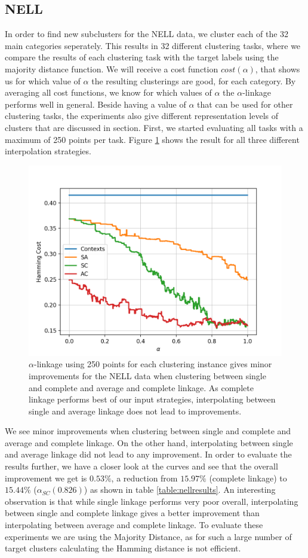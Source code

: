 \subsection{NELL}

In order to find new subclusters for the NELL data, we cluster each of the 32 main categories seperately. This results in 32 different clustering tasks, where we compare the results of each clustering task with the target labels using the majority distance function. We will receive a cost function $cost(\alpha)$, that shows us for which value of $\alpha$ the resulting clusterings are good, for each category. By averaging all cost functions, we know for which values of $\alpha$ the $\alpha$-linkage performs well in general. Beside having a value of $\alpha$ that can be used for other clustering tasks, the experiments also give different representation levels of clusters that are discussed in section. First, we started evaluating all tasks with a maximum of 250 points per task. Figure \ref{fig:nellresults} shows the result for all three different interpolation strategies.

\begin{figure}[h]
\centering
  \includegraphics[width=.5\linewidth]{plots/nell_250}
\caption{$\alpha$-linkage using 250 points for each clustering instance gives minor improvements for the NELL data when clustering between single and complete and average and complete linkage. As complete linkage performs best of our input strategies, interpolating between single and average linkage does not lead to improvements.}
\label{fig:nellresults}
\end{figure}

We see minor improvements when clustering between single and complete and average and complete linkage. On the other hand, interpolating between single and average linkage did not lead to any improvement. In order to evaluate the results further, we have a closer look at the curves and see that the overall improvement we get is $0.53\%$, a reduction from $15.97\%$ (complete linkage) to $15.44\%$ ($\alpha_{SC}(0.826)$) as shown in table \ref{table:nellresults}. An interesting observation is that while single linkage performs very poor overall, interpolating between single and complete linkage gives a better improvement than interpolating between average and complete linkage. To evaluate these experiments we are using the Majority Distance, as for such a large number of target clusters calculating the Hamming distance is not efficient. 

